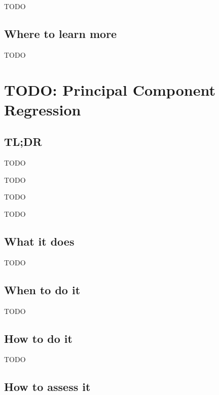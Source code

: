 \documentclass[
]{book}
\providecommand{\tightlist}{%
  \setlength{\itemsep}{0pt}\setlength{\parskip}{0pt}}
\begin{document}
TODO

\hypertarget{where-to-learn-more-13}{%
\section{Where to learn more}\label{where-to-learn-more-13}}

TODO

\hypertarget{principal-component-regression}{%
\chapter{TODO: Principal Component Regression}\label{principal-component-regression}}

\hypertarget{tldr-14}{%
\section{TL;DR}\label{tldr-14}}

\begin{description}
\tightlist
\item[What it does]
TODO
\item[When to do it]
TODO
\item[How to do it]
TODO
\item[How to assess it]
TODO
\end{description}

\hypertarget{what-it-does-14}{%
\section{What it does}\label{what-it-does-14}}

TODO

\hypertarget{when-to-do-it-14}{%
\section{When to do it}\label{when-to-do-it-14}}

TODO

\hypertarget{how-to-do-it-14}{%
\section{How to do it}\label{how-to-do-it-14}}

TODO

\hypertarget{how-to-assess-it-14}{%
\section{How to assess it}\label{how-to-assess-it-14}}
\end{document}
